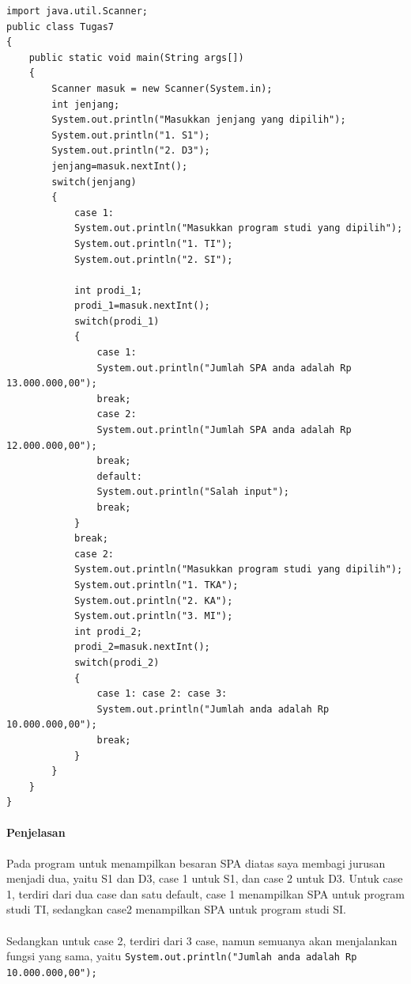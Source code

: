 \documentclass[a4paper,12pt]{article}
\begin{document}
\begin{lstlisting}
import java.util.Scanner;
public class Tugas7
{
    public static void main(String args[])
    {
        Scanner masuk = new Scanner(System.in);
        int jenjang;
        System.out.println("Masukkan jenjang yang dipilih");
        System.out.println("1. S1");
        System.out.println("2. D3");
        jenjang=masuk.nextInt();
        switch(jenjang)
        {
            case 1:
    	    System.out.println("Masukkan program studi yang dipilih");
            System.out.println("1. TI");
            System.out.println("2. SI");
            
    	    int prodi_1;
            prodi_1=masuk.nextInt();
            switch(prodi_1)
            {
                case 1:
                System.out.println("Jumlah SPA anda adalah Rp 13.000.000,00");
                break;
                case 2:
                System.out.println("Jumlah SPA anda adalah Rp 12.000.000,00");
                break;
                default:
                System.out.println("Salah input");
                break;
            }
            break;
            case 2:
            System.out.println("Masukkan program studi yang dipilih");
            System.out.println("1. TKA");              
            System.out.println("2. KA");
            System.out.println("3. MI");
    	    int prodi_2;
            prodi_2=masuk.nextInt();
            switch(prodi_2)
            {
                case 1: case 2: case 3:
                System.out.println("Jumlah anda adalah Rp 10.000.000,00");
                break;
            }
        }
    }
}
\end{lstlisting}
\paragraph{Penjelasan\\}
Pada program untuk menampilkan besaran SPA diatas saya membagi jurusan menjadi dua, yaitu S1 dan D3, case 1 untuk S1, dan case 2  untuk D3. Untuk case 1, terdiri dari dua case dan satu default, case 1 menampilkan SPA untuk program studi TI, sedangkan case2 menampilkan SPA untuk program studi SI.
\paragraph{}
Sedangkan untuk case 2, terdiri dari 3 case, namun semuanya akan menjalankan fungsi yang sama, yaitu \texttt{System.out.println("Jumlah anda adalah Rp 10.000.000,00");}
\end{document}
